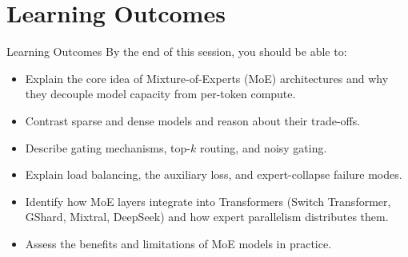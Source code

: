 \section{Learning Outcomes}
\begin{frame}{Learning Outcomes}
    By the end of this session, you should be able to:
    \vspace{0.5em}
    \begin{itemize}
        \item Explain the core idea of Mixture-of-Experts (MoE) architectures and why they decouple model capacity from per-token compute.
        \item Contrast sparse and dense models and reason about their trade-offs.
        \item Describe gating mechanisms, top-$k$ routing, and noisy gating.
        \item Explain load balancing, the auxiliary loss, and expert-collapse failure modes.
        \item Identify how MoE layers integrate into Transformers (Switch Transformer, GShard, Mixtral, DeepSeek) and how expert parallelism distributes them.
        \item Assess the benefits and limitations of MoE models in practice.
    \end{itemize}
\end{frame}
